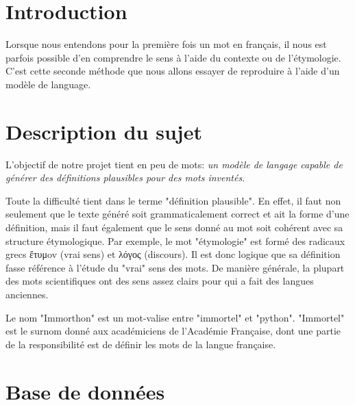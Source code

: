 \documentclass[french]{template}
\begin{document}


\fairemarges
\fairepagedegarde
\tabledematieres

\section{Introduction}

Lorsque nous entendons pour la première fois un mot en français, il nous est parfois possible d'en comprendre le sens à l'aide du contexte ou de l'étymologie. C'est cette seconde méthode que nous allons essayer de reproduire à l'aide d'un modèle de language.

\section{Description du sujet}

L'objectif de notre projet tient en peu de mots: \textit{un modèle de langage capable de générer des définitions plausibles pour des mots inventés}.

Toute la difficulté tient dans le terme "définition plausible". En effet, il faut non seulement que le texte généré soit grammaticalement correct et ait la forme d'une définition, mais il faut également que le sens donné au mot soit cohérent avec sa structure étymologique. Par exemple, le mot "étymologie" est formé des radicaux grecs {ἔτυμov} (vrai sens) et {λόγος} (discours). Il est donc logique que sa définition fasse référence à l'étude du "vrai" sens des mots. De manière générale, la plupart des mots scientifiques ont des sens assez clairs pour qui a fait des langues anciennes.

Le nom "Immorthon" est un mot-valise entre "immortel" et "python". "Immortel" est le
surnom donné aux académiciens de l’Académie Française, dont une partie de la responsibilité
est de définir les mots de la langue française.

\section{Base de données}
\end{document}
